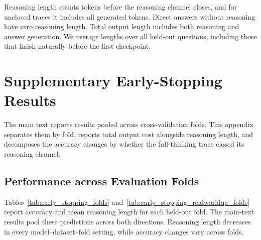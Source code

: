 \documentclass{article} %
\begin{document}
Reasoning length counts tokens before the reasoning channel closes, and for unclosed traces it includes all generated tokens. Direct answers without reasoning have zero reasoning length. Total output length includes both reasoning and answer generation. We average lengths over all held-out questions, including those that finish naturally before the first checkpoint.

\section{Supplementary Early-Stopping Results}

The main text reports results pooled across cross-validation folds. This appendix separates them by fold, reports total output cost alongside reasoning length, and decomposes the accuracy changes by whether the full-thinking trace closed its reasoning channel.

\subsection{Performance across Evaluation Folds}
\label{app:early_stopping_realworldqa}

Tables~\ref{tab:early_stopping_folds} and~\ref{tab:early_stopping_realworldqa_folds} report accuracy and mean reasoning length for each held-out fold. The main-text results pool these predictions across both directions. Reasoning length decreases in every model--dataset--fold setting, while accuracy changes vary across folds.
\end{document}
